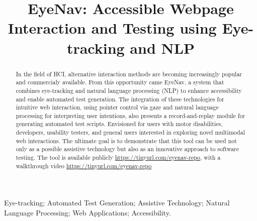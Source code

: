 \documentclass[10pt, conference]{IEEEtran}
\begin{document}
\title{EyeNav: Accessible Webpage Interaction and Testing using Eye-tracking and NLP}

\author{
}

\maketitle

\begin{abstract}
In the field of \ac{HCI}, alternative interaction methods are becoming increasingly popular and commercialy available. From this opportunity came EyeNav, a system that combines eye-tracking and natural language processing (NLP) to enhance accessibility and enable automated test generation. The integration of these technologies for intuitive web interaction, using pointer control via gaze and natural language processing for interpreting user intentions, also presents a record-and-replay module for generating automated test scripts. Envisioned for users with motor disabilities, developers, usability testers, and general users interested in exploring novel multimodal web interactions. %
The ultimate goal is to demonstrate that this tool can be used not only as a possible assistive technology but also as an innovative approach to software testing. The tool is available publicly \href{https://tinyurl.com/eyenav-repo}{https://tinyurl.com/eyenav-repo}, with a walkthrough video \href{https://tinyurl.com/eyenav-repo}{https://tinyurl.com/eyenav-repo} %
\end{abstract}


\begin{IEEEkeywords}
Eye-tracking; Automated Test Generation; Assistive Technology; Natural Language Processing; Web Applications; Accessibility.
\end{IEEEkeywords}
\end{document}
